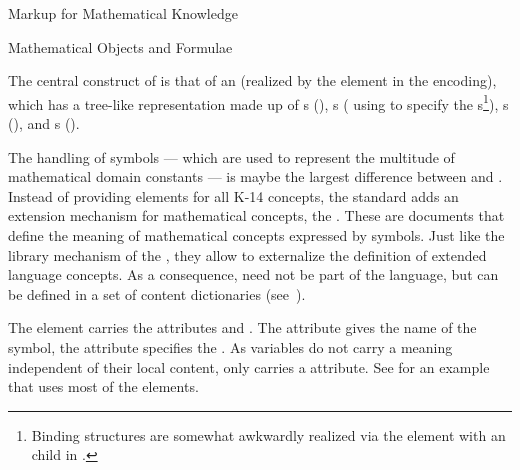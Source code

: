 \begin{tchapter}[id=math-markup]{Markup for Mathematical Knowledge}
\begin{tsection}[id=math-objects]{Mathematical Objects and Formulae}
\begin{tsubsection}[id=math-markup:openmath]{\openmath}
  The central construct of {\openmath} is that of an {}
  (realized by the element {} in the {\xml} encoding), which has
  a tree-like representation made up of {s}
  ({}), {s}
  ({} using {} to specify the
  {s}\footnote{Binding structures are somewhat awkwardly realized
    via the {} element with an {} child
    in {\cmathml}.}), {s} ({}), and
  {s} ({}). 

  The handling of symbols --- which are used to represent the multitude of mathematical
  domain constants --- is maybe the largest difference between {\openmath} and {\cmathml}.
  Instead of providing elements for all K-14 concepts, the {\openmath} standard adds an
  extension mechanism for mathematical concepts, the {}.  These are {}
  documents that define the meaning of mathematical concepts expressed by {\openmath}
  symbols.  Just like the library mechanism of the {},
  they allow {\openmath} to externalize the definition of extended language concepts. As a
  consequence, {} need not be part of the {\openmath} language, but can be
  defined in a set of content dictionaries (see~\cite{URL:omcd-core}).

  The {} element carries the attributes {} and
  {}.  The {} attribute gives the name of the
  symbol, the {} attribute specifies the {}. As variables do not carry a meaning independent of their local
  content, {} only carries a {}
  attribute. See {} for an example that uses most of the elements.


\end{tsubsection}
\end{tsection}
\end{tchapter}
